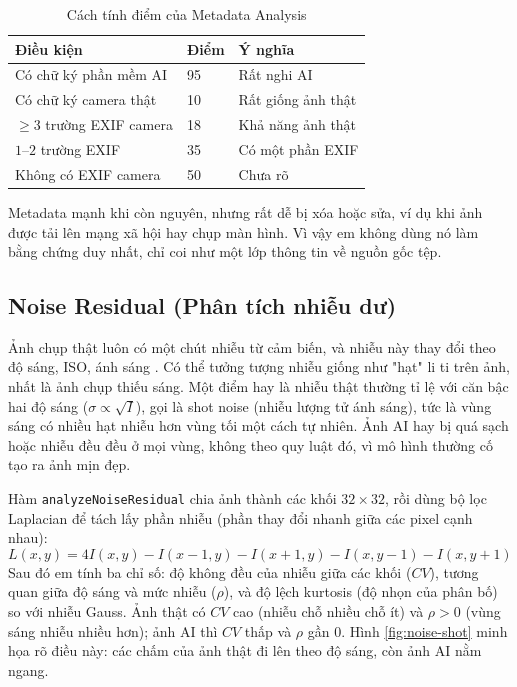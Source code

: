 \documentclass[14pt,a4paper,oneside]{report}
\begin{document}
\begin{table}[H]
\centering
\caption{Cách tính điểm của Metadata Analysis}
\label{tab:metadata-rules}
\begin{tabularx}{\textwidth}{p{}p{}Y}
\toprule
\textbf{Điều kiện} & \textbf{Điểm} & \textbf{Ý nghĩa} \\
\midrule
Có chữ ký phần mềm AI & 95 & Rất nghi AI \\
Có chữ ký camera thật & 10 & Rất giống ảnh thật \\
$\geq 3$ trường EXIF camera & 18 & Khả năng ảnh thật \\
$1$--$2$ trường EXIF & 35 & Có một phần EXIF \\
Không có EXIF camera & 50 & Chưa rõ \\
\bottomrule
\end{tabularx}
\end{table}

Metadata mạnh khi còn nguyên, nhưng rất dễ bị xóa hoặc sửa, ví dụ khi ảnh được tải lên mạng xã hội hay chụp màn hình. Vì vậy em không dùng nó làm bằng chứng duy nhất, chỉ coi như một lớp thông tin về nguồn gốc tệp.

\subsection{Noise Residual (Phân tích nhiễu dư)}
Ảnh chụp thật luôn có một chút nhiễu từ cảm biến, và nhiễu này thay đổi theo độ sáng, ISO, ánh sáng \cite{lukas,fridrich2009}. Có thể tưởng tượng nhiễu giống như "hạt" li ti trên ảnh, nhất là ảnh chụp thiếu sáng. Một điểm hay là nhiễu thật thường tỉ lệ với căn bậc hai độ sáng ($\sigma\propto\sqrt{I}$), gọi là shot noise (nhiễu lượng tử ánh sáng), tức là vùng sáng có nhiều hạt nhiễu hơn vùng tối một cách tự nhiên. Ảnh AI hay bị quá sạch hoặc nhiễu đều đều ở mọi vùng, không theo quy luật đó, vì mô hình thường cố tạo ra ảnh mịn đẹp.

Hàm \texttt{analyzeNoiseResidual} chia ảnh thành các khối $32\times32$, rồi dùng bộ lọc Laplacian để tách lấy phần nhiễu (phần thay đổi nhanh giữa các pixel cạnh nhau):
\[
L(x,y)=4I(x,y)-I(x{-}1,y)-I(x{+}1,y)-I(x,y{-}1)-I(x,y{+}1)
\]
Sau đó em tính ba chỉ số: độ không đều của nhiễu giữa các khối ($CV$), tương quan giữa độ sáng và mức nhiễu ($\rho$), và độ lệch kurtosis (độ nhọn của phân bố) so với nhiễu Gauss. Ảnh thật có $CV$ cao (nhiễu chỗ nhiều chỗ ít) và $\rho>0$ (vùng sáng nhiễu nhiều hơn); ảnh AI thì $CV$ thấp và $\rho$ gần 0. Hình \ref{fig:noise-shot} minh họa rõ điều này: các chấm của ảnh thật đi lên theo độ sáng, còn ảnh AI nằm ngang.
\end{document}
